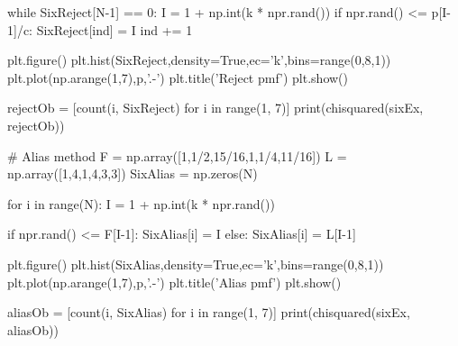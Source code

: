 \begin{python}
while SixReject[N-1] == 0:
    I = 1 + np.int(k * npr.rand())
    if npr.rand() <= p[I-1]/c:
        SixReject[ind] = I
        ind += 1


plt.figure()
plt.hist(SixReject,density=True,ec='k',bins=range(0,8,1))
plt.plot(np.arange(1,7),p,'.-')
plt.title('Reject pmf')
plt.show()

rejectOb = [count(i, SixReject) for i in range(1, 7)]
print(chisquared(sixEx, rejectOb))


# Alias method
F = np.array([1,1/2,15/16,1,1/4,11/16])
L = np.array([1,4,1,4,3,3])
SixAlias = np.zeros(N)

for i in range(N):
    I = 1 + np.int(k * npr.rand())

    if npr.rand() <= F[I-1]:
        SixAlias[i] = I
    else:
        SixAlias[i] = L[I-1]

plt.figure()
plt.hist(SixAlias,density=True,ec='k',bins=range(0,8,1))
plt.plot(np.arange(1,7),p,'.-')
plt.title('Alias pmf')
plt.show()

aliasOb = [count(i, SixAlias) for i in range(1, 7)]
print(chisquared(sixEx, aliasOb))


\end{python}


